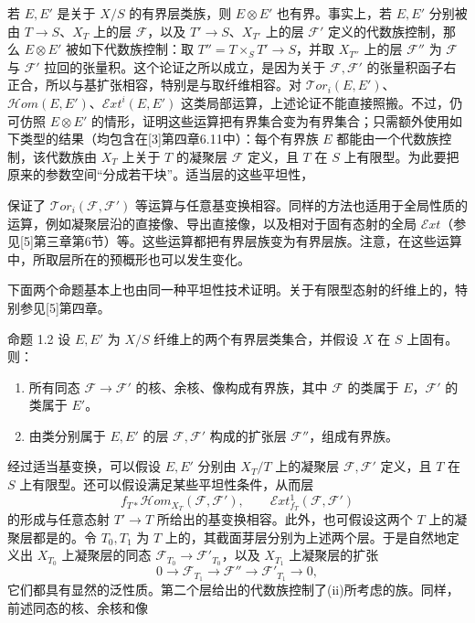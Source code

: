 若 $E,E'$ 是关于 $X/S$ 的有界层类族，则 $E\otimes E'$ 也有界。事实上，若 $E,E'$ 分别被由 $T\to S$、$X_T$ 上的层 $\mathcal F$，以及 $T'\to S$、$X_{T'}$ 上的层 $\mathcal F'$ 定义的代数族控制，那么 $E\otimes E'$ 被如下代数族控制：取 $T''=T\times_ST'\to S$，并取 $X_{T''}$ 上的层 $\mathcal F''$ 为 $\mathcal F$ 与 $\mathcal F'$ 拉回的张量积。这个论证之所以成立，是因为关于 $\mathcal F,\mathcal F'$ 的张量积函子右正合，所以与基扩张相容，特别是与取纤维相容。对 $\mathcal{T}or_i(E,E')$、$\mathcal{H}om(E,E')$、$\mathcal{E}xt^i(E,E')$ 这类局部运算，上述论证不能直接照搬。不过，仍可仿照 $E\otimes E'$ 的情形，证明这些运算把有界集合变为有界集合；只需额外使用如下类型的结果（均包含在[3]第四章6.11中）：每个有界族 $E$ 都能由一个代数族控制，该代数族由 $X_T$ 上关于 $T$ 的凝聚层 $\mathcal F$ 定义，且 $T$ 在 $S$ 上有限型。为此要把原来的参数空间“分成若干块”。适当层的这些平坦性，

保证了 $\mathcal{T}or_i(\mathcal F,\mathcal F')$ 等运算与任意基变换相容。同样的方法也适用于全局性质的运算，例如凝聚层沿的直接像、导出直接像，以及相对于固有态射的全局 $\mathcal{E}xt$（参见[5]第三章第6节）等。这些运算都把有界层族变为有界层族。注意，在这些运算中，所取层所在的预概形也可以发生变化。

下面两个命题基本上也由同一种平坦性技术证明。关于有限型态射的纤维上的，特别参见[5]第四章。

\begin{statement}{命题 1.2}
设 $E,E'$ 为 $X/S$ 纤维上的两个有界层类集合，并假设 $X$ 在 $S$ 上固有。则：
\begin{enumerate}[label=(\roman*)]
\item 所有同态 $\mathcal F\to\mathcal F'$ 的核、余核、像构成有界族，其中 $\mathcal F$ 的类属于 $E$，$\mathcal F'$ 的类属于 $E'$。
\item 由类分别属于 $E,E'$ 的层 $\mathcal F,\mathcal F'$ 构成的扩张层 $\mathcal F''$，组成有界族。
\end{enumerate}
\end{statement}
经过适当基变换，可以假设 $E,E'$ 分别由 $X_T/T$ 上的凝聚层 $\mathcal F,\mathcal F'$ 定义，且 $T$ 在 $S$ 上有限型。还可以假设满足某些平坦性条件，从而层
\[
f_{T*}\mathcal{H}om_{X_T}(\mathcal F,\mathcal F'),\qquad
\mathcal{E}xt^1_{f_T}(\mathcal F,\mathcal F')
\]
的形成与任意态射 $T'\to T$ 所给出的基变换相容。此外，也可假设这两个 $T$ 上的凝聚层都是的。令 $T_0,T_1$ 为 $T$ 上的，其截面芽层分别为上述两个层。于是自然地定义出 $X_{T_0}$ 上凝聚层的同态 $\mathcal F_{T_0}\to\mathcal F'_{T_0}$，以及 $X_{T_1}$ 上凝聚层的扩张
\[
0\longrightarrow\mathcal F_{T_1}\longrightarrow\mathcal F''
\longrightarrow\mathcal F'_{T_1}\longrightarrow0,
\]
它们都具有显然的泛性质。第二个层给出的代数族控制了(ii)所考虑的族。同样，前述同态的核、余核和像

